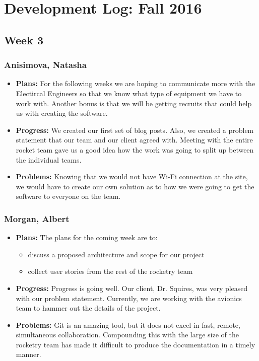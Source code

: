 \documentclass[10pt,draftclsnofoot,onecolumn]{IEEEtran}
\begin{document}
\section{Development Log: Fall 2016}


\subsection{Week 3}
\subsubsection{Anisimova, Natasha}
\begin{itemize}
	\item \textbf{Plans: }
	For the following weeks we are hoping to communicate more with the Electircal Engineers so that 
	we know what type of equipment we have to work with. Another bonus is that we will be getting recruits that could 
	help us with creating the software.
	\item \textbf{Progress: }
	We created our first set of blog posts. Also, we created a problem statement that our team
	and our client agreed with. Meeting with the entire rocket team gave us a good idea how the work was going to split up 
	between the individual teams. 
	\item \textbf{Problems: }
	Knowing that we would not have Wi-Fi connection at the site, we would have to create our own
	solution as to how we were going to get the software to everyone on the team.
\end{itemize}
\subsubsection{Morgan, Albert}
\begin{itemize}
	\item \textbf{Plans: }
The plans for the coming week are to:
\begin{itemize}
	\item discuss a proposed architecture and scope for our project
	\item collect user stories from the rest of the rocketry team
\end{itemize}
\item \textbf{Progress: }
Progress is going well. Our client, Dr. Squires, was very pleased with our problem statement. Currently, we are working with the avionics team to hammer out the details of the project.
\item \textbf{Problems: }
Git is an amazing tool, but it does not excel in fast, remote, simultaneous collaboration. Compounding this with the large size of the rocketry team has made it difficult to produce the documentation in a timely manner.
\end{itemize}
\end{document}
